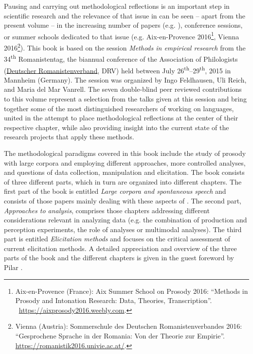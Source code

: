 \documentclass[output=paper]{langsci/langscibook}
\begin{document}
Pausing and carrying out methodological reflections is an important step in scientific research and the relevance of that issue in  can be seen – apart from the present volume – in the increasing number of papers (e.g. \citealt{Niebuhr2015,Cole.2016}), conference sessions, or summer schools dedicated to that issue (e.g. Aix-en-Provence 2016\footnote{ Aix-en-Provence (France): Aix Summer School on Prosody 2016: “Methods in Prosody and Intonation Research: Data, Theories, Transcription”. ~\href{https://aixprosody2016.weebly.com}{https://aixprosody2016.weebly.com}.}, Vienna 2016\footnote{Vienna (Austria): Sommerschule des Deutschen Romanistenverbandes 2016: “Gesprochene Sprache in der Romania: Von der Theorie zur Empirie”. \href{https://romanistik2016.univie.ac.at/}{https://romanistik2016.univie.ac.at/}.}). This book is based on the session \textit{Methods in empirical  research} from the 34\textsuperscript{th} Romanistentag, the biannual conference of the  Association of  Philologists (\href{http://www.deutscher-romanistenverband.de/}{Deutscher Romanistenverband}, DRV) held between July 26\textsuperscript{th}--29\textsuperscript{th}, 2015 in Mannheim (Germany). The session was organized by Ingo Feldhausen, Uli Reich, and Maria del Mar Vanrell. The seven double-blind peer reviewed contributions to this volume represent a selection from the talks given at this session and bring together some of the most distinguished researchers of  working on  languages, united in the attempt to place methodological reflections at the center of their respective chapter, while also providing insight into the current state of the research projects that apply these methods.\largerpage

The methodological paradigms covered in this book include the study of pro\-sody with large corpora and  employing different approaches, more controlled  analyses, and questions of  data collection, manipulation and elicitation. The book consists of three different parts, which in turn are organized into different chapters. The first part of the book is entitled \textit{Large corpora and spontaneous speech} and consists of those papers mainly dealing with these aspects of . The second part, \textit{Approaches to  analysis}, comprises those chapters addressing different considerations relevant in analyzing  data (e.g. the combination of production and perception experiments, the role of  analyses or multimodal analyses). The third part is entitled \textit{Elicitation methods} and focuses on the critical assessment of current elicitation methods. A detailed appreciation and overview of the three parts of the book and the different chapters is given in the guest foreword by Pilar \citeauthor{Prieto.2018}.
\end{document}
